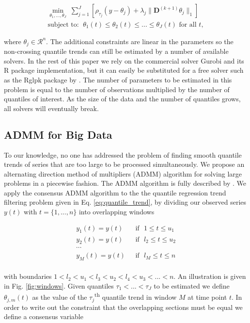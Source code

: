 \documentclass[12pt]{article}
\begin{document}
	\begin{eqnarray}
	\label{eq:noncross_trend}
	\underset{\theta_1, ..., \theta_J}{\min}\; \sum_{j=1}^J \left [\rho_{\tau_j}(y - \theta_{j}) + 
	\lambda_j \lVert \mathbf{D}^{(k+1)} \theta_j \rVert_1 \right ] \\
	 \text{subject to: }\; \theta_{1}(t) \le \theta_{2}(t) \le ... \le \theta_{J}(t) \text{ for all } t,
	\end{eqnarray}
	
	where $\theta_j \in \mathcal{R}^n$. The additional constraints are linear in the parameters so the non-crossing quantile trends can still be estimated by a number of available solvers. In the rest of this paper we rely on the commercial solver Gurobi \citep{gurobi} and its R package implementation, but it can easily be substituted for a free solver such as the Rglpk package by \cite{rglpk}. The number of parameters to be estimated in this problem is equal to the number of observations multiplied by the number of quantiles of interest. As the size of the data and the number of quantiles grows, all solvers will eventually break. 
	
	\subsection{ADMM for Big Data}
	
	To our knowledge, no one has addressed the problem of finding smooth quantile trends of series that are too large to be processed simultaneously. We propose an alternating direction method of multipliers (ADMM) algorithm for solving large problems in a piecewise fashion. The ADMM algorithm \citep{gabay1975dual, glowinski1975approximation} is fully described by \cite{boyd2011distributed}. We apply the consensus ADMM algorithm to the the quantile regression trend filtering problem given in Eq. \ref{eq:quantile_trend}, by dividing our observed series $y(t)$ with $t = \{1, ..., n\}$ into overlapping windows 
	
	\begin{align*}
	y_1(t) = y(t) & \mbox{~~if~~} 1 \le t \le u_{1}\\
	y_2(t) = y(t) & \mbox{~~if~~} l_{2} \le t \le u_{2} \\
	\cdots & \\
	y_M(t) = y(t) & \mbox{~~if~~} l_{M} \le t \le  n\\
	\end{align*}

	 with boundaries $1 < l_{2} < u_{1} < l_{3} < u_{2} < l_{4} < u_{3} < ...< n$. An illustration is given in Fig. \ref{fig:windows}. Given quantiles $\tau_1 < ... < \tau_J$ to be estimated we define $\theta_{j,m}(t)$ as the value of the $\tau_j$\textsuperscript{th} quantile trend in window $M$ at time point $t$. In order to write out the constraint that the overlapping sections must be equal we define a consensus variable
	 
\end{document}
